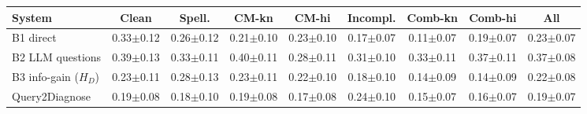\begin{tabular}{lcccccccc}
\toprule
System & Clean & Spell. & CM-kn & CM-hi & Incompl. & Comb-kn & Comb-hi & All \\
\midrule
B1 direct & 0.33$\pm$0.12 & 0.26$\pm$0.12 & 0.21$\pm$0.10 & 0.23$\pm$0.10 & 0.17$\pm$0.07 & 0.11$\pm$0.07 & 0.19$\pm$0.07 & 0.23$\pm$0.07 \\
B2 LLM questions & 0.39$\pm$0.13 & 0.33$\pm$0.11 & 0.40$\pm$0.11 & 0.28$\pm$0.11 & 0.31$\pm$0.10 & 0.33$\pm$0.11 & 0.37$\pm$0.11 & 0.37$\pm$0.08 \\
B3 info-gain ($H_D$) & 0.23$\pm$0.11 & 0.28$\pm$0.13 & 0.23$\pm$0.11 & 0.22$\pm$0.10 & 0.18$\pm$0.10 & 0.14$\pm$0.09 & 0.14$\pm$0.09 & 0.22$\pm$0.08 \\
Query2Diagnose & 0.19$\pm$0.08 & 0.18$\pm$0.10 & 0.19$\pm$0.08 & 0.17$\pm$0.08 & 0.24$\pm$0.10 & 0.15$\pm$0.07 & 0.16$\pm$0.07 & 0.19$\pm$0.07 \\
\bottomrule
\end{tabular}
